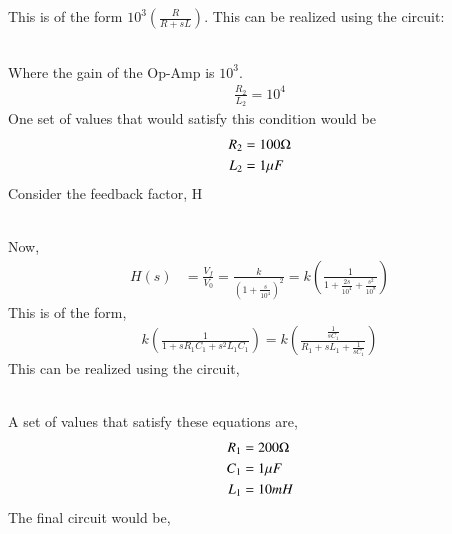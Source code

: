 \begin{enumerate}[label=\thesection.\arabic*.,ref=\thesection.\theenumi]
This is of the form $10^3 \left(\frac{R}{R+sL}\right)$.
This can be realized using the circuit:
\begin{figure}[!ht]
	\begin{center}
		\resizebox{\columnwidth}{!}{}
	\end{center}
\caption{}
\label{fig:ee18btech11006_3}
\end{figure} \\
Where the gain of the Op-Amp is $10^3$.
\begin{align}
    \frac{R_2}{L_2}=10^4
\end{align}
One set of values that would satisfy this condition would be 
\begin{align}
    R_2&= 100\ohm \\
    L_2&=1 \mu F
\end{align}
Consider the feedback factor, H \newline
\begin{figure}[!ht]
	\begin{center}
		\resizebox{\columnwidth}{!}{}
	\end{center}
\caption{}
\label{fig:ee18btech11006_5}
\end{figure} \\
Now, 
\begin{align}
H(s)&=\frac{V_f}{V_0}= \frac{k}{\left(1+\frac{s}{10^4}\right)^2} = k\left({\frac{1}{1+\frac{2s}{10^4}+\frac{s^2}{10^8}}}\right)  
\end{align}
This is of the form,
\begin{align}
k\left(\frac{1}{1+s{R_1}{C_1}+{s^2}{L_1}{C_1}}\right) =  k\left(\frac{\frac{1}{s{C_1}}}{{R_1}+s{L_1}+\frac{1}{s{C_1}}}\right)  
\end{align}
This can be realized using the circuit,
\begin{figure}[!ht]
	\begin{center}
		\resizebox{\columnwidth}{!}{}
	\end{center}
\caption{}
\label{fig:ee18btech11006_2}
\end{figure} \\
A set of values that satisfy these equations are,
\begin{align}
R_1&= 200\ohm \\
C_1&= 1\mu F\\
L_1&= 10mH 
\end{align}
The final circuit would be,
\begin{figure}[!ht]
	\begin{center}
		\resizebox{2\columnwidth}{!}{}
	\end{center}
\caption{}
\label{fig:ee18btech11006_6}
\end{figure}
\end{enumerate}
